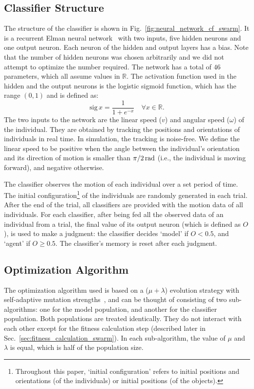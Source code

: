 \subsection{Classifier Structure}

The structure of the classifier is shown in Fig.~\ref{fig:neural_network_cf_swarm}. It is a recurrent Elman neural network~\cite{Elman1990} with two inputs, five hidden neurons and one output neuron. Each neuron of the hidden and output layers has a bias. Note that the number of hidden neurons was chosen arbitrarily and we did not attempt to optimize the number required. The network has a total of $46$ parameters, which all assume values in $\mathbb{R}$. The activation function used in the hidden and the output neurons is the logistic sigmoid function, which has the range $\left(0,1\right)$ and is defined as: 
%
\begin{equation}\label{equ:logistic_sigmoid}
\textrm{sig}\,x = \frac{1}{1+e^{-x}}\quad\forall x \in \mathbb{R}.
\end{equation}
%
The two inputs to the network are the linear speed ($v$) and angular speed ($\omega$) of the individual. They are obtained by tracking the positions and orientations of individuals in real time. In simulation, the tracking is noise-free. We define the linear speed to be positive when the angle between the individual's orientation and its direction of motion is smaller than $\unit[\pi \small/ 2]{rad}$ (i.e., the individual is moving forward), and negative otherwise. 

The classifier observes the motion of each individual over a set period of time. The initial configuration\footnote{Throughout this paper, `initial configuration' refers to initial positions and orientations (of the individuals) or initial positions (of the objects).} of the individuals are randomly generated in each trial. After the end of the trial, all classifiers are provided with the motion data of all individuals. For each classifier, after being fed all the observed data of an individual from a trial, the final value of its output neuron (which is defined as $O$), is used to make a judgment: the classifier decides `model' if $O<0.5$, and `agent' if $O\geq0.5$. The classifier's memory is reset after each judgment.

\subsection{Optimization Algorithm}\label{sec:optimization_algorithm_swarm}
The optimization algorithm used is based on a ($\mu+\lambda$) evolution strategy with self-adaptive mutation strengths~\cite{Beyer2001, Beyer2002, Eiben2003}, and can be thought of consisting of two sub-algorithms: one for the model population, and another for the classifier population. Both populations are treated identically. They do not interact with each other except for the fitness calculation step (described later in Sec.~\ref{sec:fitness_calculation_swarm}). In each sub-algorithm, the value of $\mu$ and $\lambda$ is equal, which is half of the population size. 

